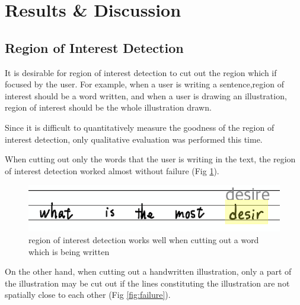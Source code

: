 \section{Results \& Discussion}

\subsection{Region of Interest Detection}

It is desirable for region of interest detection to cut out the region which if focused by
the user. For example, when a user is writing a sentence,region of interest should be a word
written, and when a user is drawing an illustration, region of interest should be the whole
illustration drawn.

Since it is difficult to quantitatively measure the goodness of the region of interest detection,
only qualitative evaluation was performed this time.

When cutting out only the words that the user is writing in the text,
the region of interest detection worked almost without failure (Fig \ref{fig:cutting-word-region}).

\begin{figure}
    \centering
    \includegraphics[scale=0.6]{images/word_region.png}
    \caption{region of interest detection works well when cutting out a word which is being written}
    \label{fig:cutting-word-region}
\end{figure}

On the other hand, when cutting out a handwritten illustration,
only a part of the illustration may be cut out if the lines constituting
the illustration are not spatially close to each other (Fig \ref{fig:failure}).

